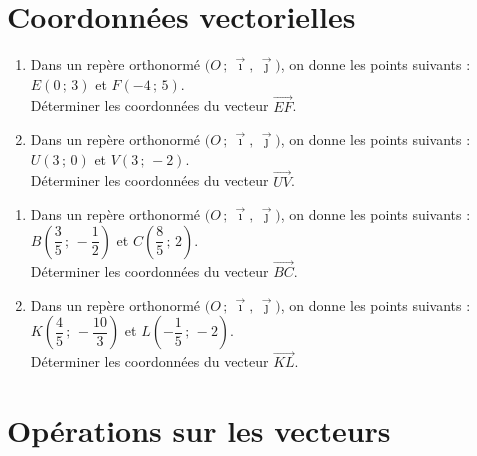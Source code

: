 \documentclass[11pt]{article}
\begin{document}
\section{Coordonnées vectorielles}

\begin{exercice}[1]

\begin{enumerate}[itemsep=1em]
\item Dans un repère orthonormé $\big(O\,;\,\vec \imath,\,\vec \jmath\big)$, on donne les points suivants : $E\left(0\,;\,3\right)$ et $F\left(-4\,;\,5\right)$.\\Déterminer les coordonnées du vecteur $\overrightarrow{EF}$.
\item Dans un repère orthonormé $\big(O\,;\,\vec \imath,\,\vec \jmath\big)$, on donne les points suivants : $U\left(3\,;\,0\right)$ et $V\left(3\,;\,-2\right)$.\\Déterminer les coordonnées du vecteur $\overrightarrow{UV}$.
\end{enumerate}
\end{exercice}

\begin{exercice}[1]

\begin{enumerate}[itemsep=1em]
\item Dans un repère orthonormé $\big(O\,;\,\vec \imath,\,\vec \jmath\big)$, on donne les points suivants : $B\left(\dfrac{3}{5}\,;\,-\dfrac{1}{2}\right)$ et $C\left(\dfrac{8}{5}\,;\,2\right)$.\\Déterminer les coordonnées du vecteur $\overrightarrow{BC}$.
\item Dans un repère orthonormé $\big(O\,;\,\vec \imath,\,\vec \jmath\big)$, on donne les points suivants : $K\left(\dfrac{4}{5}\,;\,-\dfrac{10}{3}\right)$ et $L\left(-\dfrac{1}{5}\,;\,-2\right)$.\\Déterminer les coordonnées du vecteur $\overrightarrow{KL}$.
\end{enumerate}
\end{exercice}

\section{Opérations sur les vecteurs}
\end{document}
